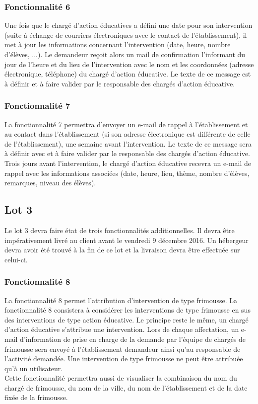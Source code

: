 \subsubsection{Fonctionnalité 6}
Une fois que le chargé d'action éducatives a défini une date pour son intervention (suite à échange de courriers électroniques avec le contact de l'établissement), il met à jour les informations concernant l'intervention (date, heure, nombre d'élèves, ...). Le demandeur reçoit alors un mail de confirmation l'informant du jour de l'heure et du lieu de l'intervention avec le nom et les coordonnées (adresse électronique, téléphone) du chargé d'action éducative. Le texte de ce message est à définir et à faire valider par le responsable des chargés d'action éducative. \\

\subsubsection{Fonctionnalité 7}
La fonctionnalité 7 permettra d'envoyer un e-mail de rappel à l'établissement et au contact dans l'établissement (si son adresse électronique est différente de celle de l'établissement), une semaine avant l'intervention. Le texte de ce message sera à définir avec \nomClient{} et à faire valider par le responsable des chargés d'action éducative. \\
Trois jours avant l'intervention, le chargé d'action éducative recevra un e-mail de rappel avec les informations associées (date, heure, lieu, thème, nombre d'élèves, remarques, niveau des élèves). 
\\

\subsection{Lot 3}
Le lot 3 devra faire état de trois fonctionnalités additionnelles. Il devra être impérativement livré au client avant le vendredi 9 décembre 2016. Un hébergeur devra avoir été trouvé à la fin de ce lot et la livraison devra être effectuée sur celui-ci.

\subsubsection{Fonctionnalité 8}
La fonctionnalité 8 permet l'attribution d'intervention de type frimousse. 
La fonctionnalité 8 consistera à considérer les interventions de type frimousse en sus des interventions de type action éducative.
Le principe reste le même, un chargé d'action éducative s'attribue une intervention.
Lors de chaque affectation, un e-mail d'information de prise en charge de la demande par l'équipe de chargés de frimousse sera envoyé à l'établissement demandeur ainsi qu'au responsable de l'activité demandée.
Une intervention de type frimousse ne peut être attribuée qu'à un utilisateur. \\
Cette fonctionnalité permettra aussi de visualiser la combinaison du nom du chargé de frimousse, du nom de la ville, du nom de l'établissement et de la date fixée de la frimousse.

